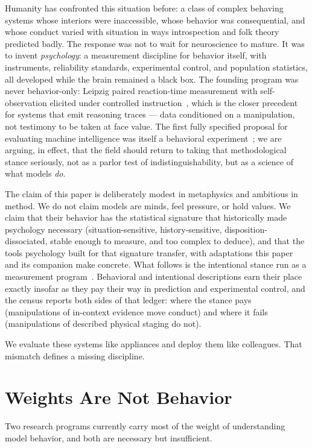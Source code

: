 \documentclass[journal]{IEEEtran}
\begin{document}
Humanity has confronted this situation before: a class of complex
behaving systems whose interiors were inaccessible, whose behavior
was consequential, and whose conduct varied with situation in ways
introspection and folk theory predicted badly. The response was not
to wait for neuroscience to mature. It was to invent
\emph{psychology}: a measurement discipline for behavior itself, with
instruments, reliability standards, experimental control, and
population statistics, all developed while the brain remained a
black box. The founding program was never behavior-only: Leipzig
paired reaction-time measurement with self-observation elicited under
controlled instruction~\cite{wundt1874grundzuge}, which is the closer
precedent for systems that emit reasoning traces --- data conditioned
on a manipulation, not testimony to be taken at face value. The first fully specified proposal for evaluating machine
intelligence was itself a behavioral experiment~\cite{turing1950computing};
we are arguing, in effect, that the field should return to taking
that methodological stance seriously, not as a parlor test of
indistinguishability, but as a science of what models \emph{do}.

The claim of this paper is deliberately modest in metaphysics and
ambitious in method. We do not claim models are minds, feel pressure,
or hold values. We claim that their behavior has the statistical
signature that historically made psychology necessary
(situation-sensitive, history-sensitive, disposition-dissociated,
stable enough to measure, and too complex to deduce), and that the
tools psychology built for that signature transfer, with adaptations
this paper and its companion make concrete. What follows is the
intentional stance run as a measurement
program~\cite{dennett1987stance}. Behavioral and intentional
descriptions earn their place exactly insofar as they pay their way
in prediction and experimental control, and the census reports both
sides of that ledger: where the stance pays (manipulations of
in-context evidence move conduct) and where it fails (manipulations
of described physical staging do not).

We evaluate these systems like appliances and deploy them like
colleagues. That mismatch defines a missing discipline.

\section{Weights Are Not Behavior}
Two research programs currently carry most of the weight of
understanding model behavior, and both are necessary but
insufficient.
\end{document}
